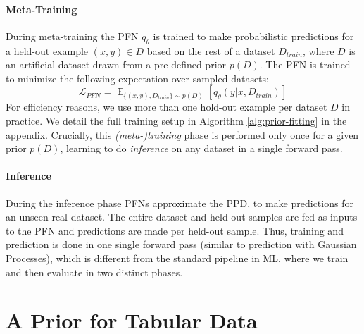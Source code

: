 \documentclass{article}
\DeclareMathOperator*{\E}{\mathbb{E}}
\begin{document}
\paragraph{Meta-Training} During meta-training the PFN $q_{\theta}$
is trained to make probabilistic predictions for a held-out example $(x,y) \in D$ based on the rest of a dataset $D_{train}$, where $D$ is an artificial dataset drawn from a pre-defined prior $p(D)$.
The PFN is trained to minimize the following expectation over sampled datasets:
\begin{equation}
    \mathcal{L}_{\textit{PFN}} = \E_{\{(x,y),D_{train}\} \sim p(D)} [q_{\theta}(y|x,D_{train})]
    \label{eq:lpfn}
\end{equation}
For efficiency reasons, we use more than one hold-out example per dataset $D$ in practice. We detail the full training setup in Algorithm \ref{alg:prior-fitting} in the appendix.
Crucially, this \textit{(meta-)training} phase is performed only once for a given prior $p(D)$, learning to do \textit{inference} on any dataset in a single forward pass.

\paragraph{Inference} During the inference phase PFNs approximate the PPD, to make predictions for an unseen real
dataset.
The entire dataset and held-out samples are fed as inputs to the PFN and predictions are made per held-out sample.
Thus, training and prediction is done in one single forward pass (similar to prediction with Gaussian Processes), which is different from the standard pipeline in ML, where we train and then evaluate in two distinct phases.


\section{A Prior for Tabular Data}\label{sec:tabprior}
\end{document}
